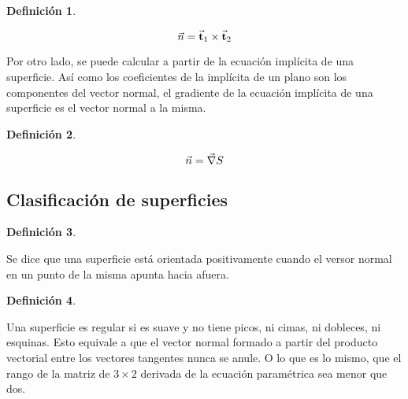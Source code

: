 \documentclass[a5paper,12pt,twoside]{book}
\newtheorem{defn}{{Definición}}[chapter]
\begin{document}
\begin{mdframed}[style=DefinitionFrame]
    \begin{defn}
    \end{defn}
    \begin{equation*}
        \Vec{n} = \Vec{\textbf{t}}_1 \times \Vec{\textbf{t}}_2
    \end{equation*}
\end{mdframed}

Por otro lado, se puede calcular a partir de la ecuación implícita de una superficie.
Así como los coeficientes de la implícita de un plano son los componentes del vector normal, el gradiente de la ecuación implícita de una superficie es el vector normal a la misma.

\begin{mdframed}[style=DefinitionFrame]
    \begin{defn}
    \end{defn}
    \begin{equation*}
        \Vec{n} = \Vec{\nabla} S
    \end{equation*}
\end{mdframed}


\subsection{Clasificación de superficies}

\begin{mdframed}[style=DefinitionFrame]
    \begin{defn}
    \end{defn}
\end{mdframed}

Se dice que una superficie está orientada positivamente cuando el versor normal en un punto de la misma apunta hacia afuera.

\begin{mdframed}[style=DefinitionFrame]
    \begin{defn}
    \end{defn}
\end{mdframed}

Una superficie es regular si es suave y no tiene picos, ni cimas, ni dobleces, ni esquinas.
Esto equivale a que el vector normal formado a partir del producto vectorial entre los vectores tangentes nunca se anule.
O lo que es lo mismo, que el rango de la matriz de $3 \times 2$ derivada de la ecuación paramétrica sea menor que dos.
\end{document}
